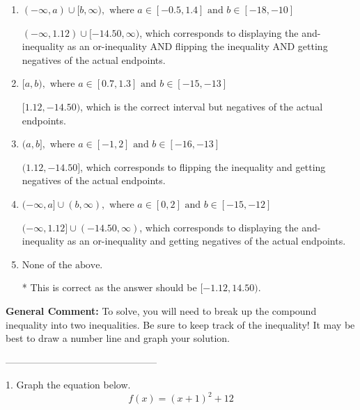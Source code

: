 \documentclass{extbook}[14pt]
\begin{document}
\begin{enumerate}[label=\Alph*.] 
\item $ (-\infty, a) \cup [b, \infty), \text{ where } a \in [-0.5, 1.4] \text{ and } b \in [-18, -10] $ 

 $(-\infty, 1.12) \cup [-14.50, \infty)$, which corresponds to displaying the and-inequality as an or-inequality AND flipping the inequality AND getting negatives of the actual endpoints. 
\item $ [a, b), \text{ where } a \in [0.7, 1.3] \text{ and } b \in [-15, -13] $ 

 $[1.12, -14.50)$, which is the correct interval but negatives of the actual endpoints. 
\item $ (a, b], \text{ where } a \in [-1, 2] \text{ and } b \in [-16, -13] $ 

 $(1.12, -14.50]$, which corresponds to flipping the inequality and getting negatives of the actual endpoints. 
\item $ (-\infty, a] \cup (b, \infty), \text{ where } a \in [0, 2] \text{ and } b \in [-15, -12] $ 

 $(-\infty, 1.12] \cup (-14.50, \infty)$, which corresponds to displaying the and-inequality as an or-inequality and getting negatives of the actual endpoints. 
\item $ \text{None of the above.} $ 

 * This is correct as the answer should be $[-1.12, 14.50)$. 
\end{enumerate} 
 
\textbf{General Comment:} To solve, you will need to break up the compound inequality into two inequalities. Be sure to keep track of the inequality! It may be best to draw a number line and graph your solution. 

-----------------------------------------------

1. Graph the equation below.
\[ f(x) = (x+1)^2 + 12 \] 
\end{document}
